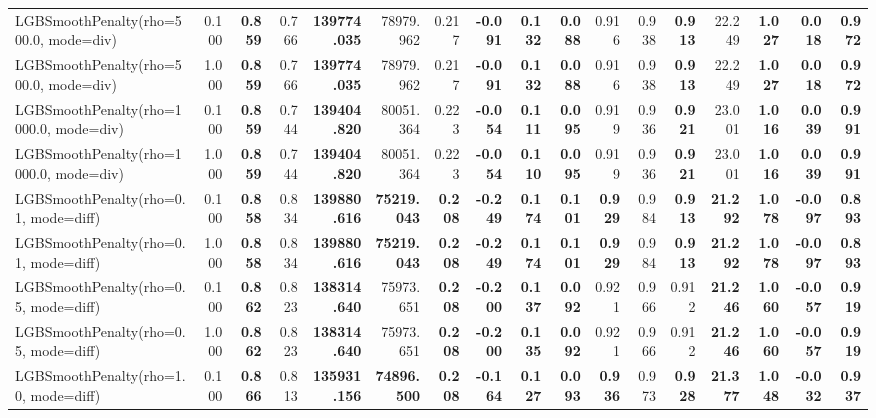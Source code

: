 \documentclass[11pt]{article}
\theoremstyle{plain}
\theoremstyle{definition}
\newcommand{\1}{\mathbf{1}}
\begin{document}
\begin{table}[htbp]
{\begin{tabular}{lrrrrrrrrrrrrrrrr}
LGBSmoothPenalty(rho=500.0, mode=div) & 0.100 & \textbf{0.859} & 0.766 & \textbf{139774.035} & 78979.962 & 0.217 & \textbf{-0.091} & \textbf{0.132} & \textbf{0.088} & 0.916 & 0.938 & \textbf{0.913} & 22.249 & \textbf{1.027} & \textbf{0.018} & \textbf{0.972} \\
LGBSmoothPenalty(rho=500.0, mode=div) & 1.000 & \textbf{0.859} & 0.766 & \textbf{139774.035} & 78979.962 & 0.217 & \textbf{-0.091} & \textbf{0.132} & \textbf{0.088} & 0.916 & 0.938 & \textbf{0.913} & 22.249 & \textbf{1.027} & \textbf{0.018} & \textbf{0.972} \\
LGBSmoothPenalty(rho=1000.0, mode=div) & 0.100 & \textbf{0.859} & 0.744 & \textbf{139404.820} & 80051.364 & 0.223 & \textbf{-0.054} & \textbf{0.111} & \textbf{0.095} & 0.919 & 0.936 & \textbf{0.921} & 23.001 & \textbf{1.016} & \textbf{0.039} & \textbf{0.991} \\
LGBSmoothPenalty(rho=1000.0, mode=div) & 1.000 & \textbf{0.859} & 0.744 & \textbf{139404.820} & 80051.364 & 0.223 & \textbf{-0.054} & \textbf{0.110} & \textbf{0.095} & 0.919 & 0.936 & \textbf{0.921} & 23.001 & \textbf{1.016} & \textbf{0.039} & \textbf{0.991} \\
LGBSmoothPenalty(rho=0.1, mode=diff) & 0.100 & \textbf{0.858} & 0.834 & \textbf{139880.616} & \textbf{75219.043} & \textbf{0.208} & \textbf{-0.249} & \textbf{0.174} & \textbf{0.101} & \textbf{0.929} & 0.984 & \textbf{0.913} & \textbf{21.292} & \textbf{1.078} & \textbf{-0.097} & \textbf{0.893} \\
LGBSmoothPenalty(rho=0.1, mode=diff) & 1.000 & \textbf{0.858} & 0.834 & \textbf{139880.616} & \textbf{75219.043} & \textbf{0.208} & \textbf{-0.249} & \textbf{0.174} & \textbf{0.101} & \textbf{0.929} & 0.984 & \textbf{0.913} & \textbf{21.292} & \textbf{1.078} & \textbf{-0.097} & \textbf{0.893} \\
LGBSmoothPenalty(rho=0.5, mode=diff) & 0.100 & \textbf{0.862} & 0.823 & \textbf{138314.640} & 75973.651 & \textbf{0.208} & \textbf{-0.200} & \textbf{0.137} & \textbf{0.092} & 0.921 & 0.966 & 0.912 & \textbf{21.246} & \textbf{1.060} & \textbf{-0.057} & \textbf{0.919} \\
LGBSmoothPenalty(rho=0.5, mode=diff) & 1.000 & \textbf{0.862} & 0.823 & \textbf{138314.640} & 75973.651 & \textbf{0.208} & \textbf{-0.200} & \textbf{0.135} & \textbf{0.092} & 0.921 & 0.966 & 0.912 & \textbf{21.246} & \textbf{1.060} & \textbf{-0.057} & \textbf{0.919} \\
LGBSmoothPenalty(rho=1.0, mode=diff) & 0.100 & \textbf{0.866} & 0.813 & \textbf{135931.156} & \textbf{74896.500} & \textbf{0.208} & \textbf{-0.164} & \textbf{0.127} & \textbf{0.093} & \textbf{0.936} & 0.973 & \textbf{0.928} & \textbf{21.377} & \textbf{1.048} & \textbf{-0.032} & \textbf{0.937} \\

\end{tabular}}
\end{table}
\end{document}
